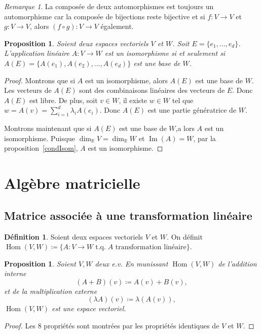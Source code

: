 \documentclass{article}
\DeclareMathOperator{\tq}{\text{ t.q. }}
\DeclareMathOperator{\Imf}{Im}
\DeclareMathOperator{\Hom}{Hom}
\newcommand{\R}{\mathbb R}
\newtheorem{prp}[thm]{Proposition}
\theoremstyle{definition}
\newtheorem{déf}[thm]{Définition}
\theoremstyle{remark}
\newtheorem*{rmq}{Remarque}
\begin{document}
		\begin{rmq} La composée de deux automorphismes est toujours un automorphisme car la composée de bijections reste bijective et si $f : V \to V$ et $g : V \to V$,
		alors $(f \circ g) : V \to V$ également. \end{rmq}

		\begin{prp} Soient deux espaces vectoriels $V$ et $W$. Soit $E = \{e_1, \dotsc, e_d\}$. L'application linéaire $A : V \to W$ est un isomorphisme si et
		seulement si $A(E) = \{A(e_1), A(e_2), \dotsc, A(e_d)\}$ est une base de $W$. \end{prp}

		\begin{proof} Montrons que si $A$ est un isomorphisme, alors $A(E)$ est une base de $W$. Les vecteurs de $A(E)$ sont des combinaisons linéaires des vecteurs
		de $E$. Donc $A(E)$ est libre. De plus, soit $v \in W$, il existe $w \in W$ tel que $w = A(v) = \sum_{i=1}^d\lambda_iA(e_i)$. Donc $A(E)$ est une partie
		génératrice de $W$.
		
		Montrons maintenant que si $A(E)$ est une base de $W$,a lors $A$ est un isomorphisme. Puisque $\dim_\R V = \dim_\R W$ et $\Imf(A) = W$, par la
		proposition~\ref{condIsom}, $A$ est un isomorphisme. \end{proof}

\newpage
\section{Algèbre matricielle}
	\subsection{Matrice associée à une transformation linéaire}
		\begin{déf} Soient deux espaces vectoriels $V$ et $W$. On définit $\Hom(V, W) \coloneqq \{A : V \to W \tq A \text { transformation linéaire}\}$. \end{déf}

		\begin{prp} Soient $V, W$ deux e.v. En munissant $\Hom(V, W)$ de l'addition interne \[(A+B)(v) \coloneqq A(v) + B(v),\] et de la multiplication externe
		\[(\lambda A)(v) \coloneqq \lambda(A(v)),\] $\Hom(V, W)$ est une espace vectoriel. \end{prp}

		\begin{proof} Les 8 propriétés sont montrées par les propriétés identiques de $V$ et $W$. \end{proof}
\end{document}
